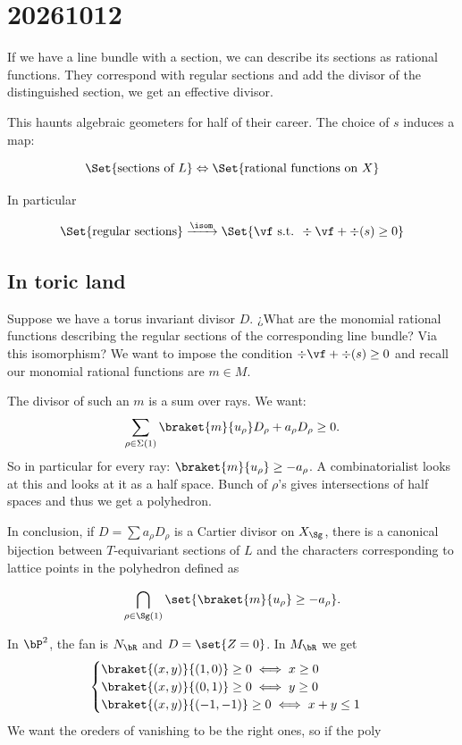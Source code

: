 \section{20261012}

If we have a line bundle with a section, we can describe its sections as rational functions. They correspond with regular sections and add the divisor of the distinguished section, we get an effective divisor.\par
This haunts algebraic geometers for half of their career. The choice of \(s\) induces a map:

\[
\Set{\text{sections of }L}\Leftrightarrow\Set{\text{rational functions on }X}
\]

In particular


\[
\Set{\text{regular sections}}\xrightarrow{\isom}\Set{\vf\text{ s.t. }\div\vf+\div(s)\geq 0}
\]

\subsection{In toric land}

Suppose we have a torus invariant divisor \(D\). ¿What are the monomial rational functions describing the regular sections of the corresponding line bundle? Via this isomorphism? We want to impose the condition \(\div\vf+\div(s)\geq 0\) and recall our monomial rational functions are \(m\in M\). \par
The divisor of such an \(m\) is a sum over rays. We want: 
\[
\sum_{\rho\in\Sigma(1)}\braket{m}{u_\rho}D_\rho+a_\rho D_\rho\geq 0.
\]
So in particular for every ray: \(\braket{m}{u_\rho}\geq -a_\rho\). A combinatorialist looks at this and looks at it as a half space. Bunch of \(\rho\)'s gives intersections of half spaces and thus we get a polyhedron.\par

In conclusion, if \(D=\sum a_\rho D_\rho\) is a Cartier divisor on \(X_\Sg\), there is a canonical bijection between \(T\)-equivariant sections of \(L\) and the characters corresponding to lattice points in the polyhedron defined as 

\[
   \bigcap_{\rho\in\Sg(1)}\set{\braket{m}{u_\rho}\geq-a_\rho}. 
\]

\begin{Ex}
In \(\bP^2\), the fan is \(N_\bR\) and \(D=\set{Z=0}\). In \(M_\bR\) we get
\[
\begin{cases}
    \braket{(x,y)}{(1,0)}\geq 0\iff x\geq 0\\
    \braket{(x,y)}{(0,1)}\geq 0\iff y\geq 0\\
    \braket{(x,y)}{(-1,-1)}\geq 0\iff x+y\leq 1
\end{cases}
\]
We want the oreders of vanishing to be the right ones, so if the poly 
\end{Ex}